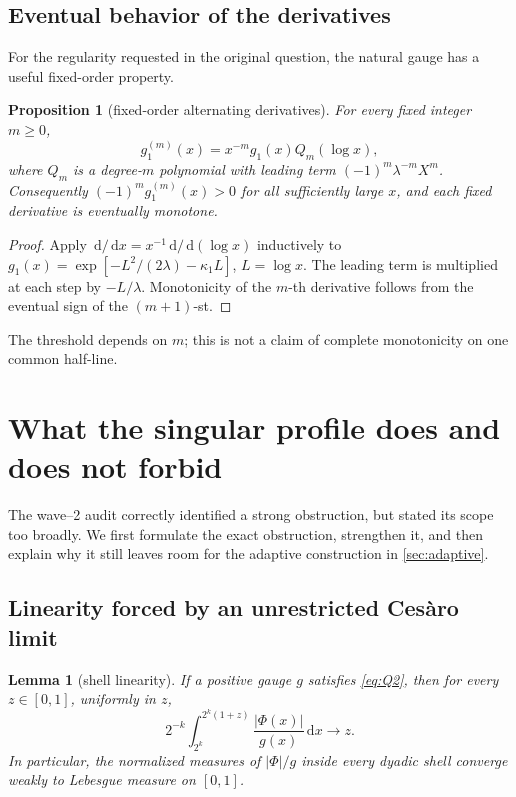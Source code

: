 \documentclass[11pt,oneside]{article}
\newtheorem{proposition}[theorem]{Proposition}
\newtheorem{lemma}[theorem]{Lemma}
\theoremstyle{definition}
\theoremstyle{remark}
\newcommand{\dd}{\,\mathrm d}
\begin{document}
\subsection{Eventual behavior of the derivatives}

For the regularity requested in the original question, the natural gauge has
a useful fixed-order property.

\begin{proposition}[fixed-order alternating derivatives]
\label{prop:derivatives}
For every fixed integer \(m\ge0\),
\begin{equation}
 g_1^{(m)}(x)=x^{-m}g_1(x)Q_m(\log x),
 \label{eq:derivative-polynomial}
\end{equation}
where \(Q_m\) is a degree-\(m\) polynomial with leading term
\((-1)^m\lambda^{-m}X^m\).  Consequently
\((-1)^mg_1^{(m)}(x)>0\) for all sufficiently large \(x\), and each fixed
derivative is eventually monotone.
\end{proposition}

\begin{proof}
Apply \(\dd/\dd x=x^{-1}\dd/\dd(\log x)\) inductively to
\(g_1(x)=\exp[-L^2/(2\lambda)-\kappa_1L]\), \(L=\log x\).  The leading
term is multiplied at each step by \(-L/\lambda\).  Monotonicity of the
\(m\)-th derivative follows from the eventual sign of the \((m+1)\)-st.
\end{proof}

The threshold depends on \(m\); this is not a claim of complete monotonicity
on one common half-line.

\section{What the singular profile does and does not forbid}
\label{sec:obstructions}

The wave--2 audit correctly identified a strong obstruction, but stated its
scope too broadly.  We first formulate the exact obstruction, strengthen it,
and then explain why it still leaves room for the adaptive construction in
\cref{sec:adaptive}.

\subsection{Linearity forced by an unrestricted Ces\`aro limit}

\begin{lemma}[shell linearity]
\label{lem:shell-linearity}
If a positive gauge \(g\) satisfies \eqref{eq:Q2}, then for every
\(z\in[0,1]\), uniformly in \(z\),
\begin{equation}
 2^{-k}\int_{2^k}^{2^k(1+z)}\frac{|\Phi(x)|}{g(x)}\dd x
 \longrightarrow z.
 \label{eq:shell-linearity}
\end{equation}
In particular, the normalized measures of \(|\Phi|/g\) inside every dyadic
shell converge weakly to Lebesgue measure on \([0,1]\).
\end{lemma}
\end{document}
